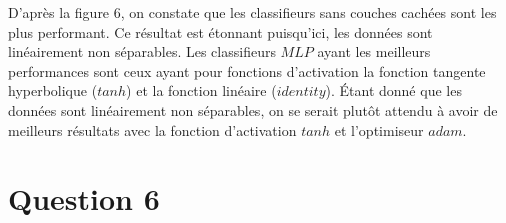 \documentclass[frenchb]{report}
\newcommand{\1}{\mathbbm{1}}
\theoremstyle{definition}\newtheorem{defn}{Définition}
\theoremstyle{definition}\newtheorem{exm}{Exemple}
\theoremstyle{definition}\newtheorem{nota}{Notation}
\theoremstyle{definition}\newtheorem{rem}{Remarque}
\begin{document}
\begin{figure}[htp] 
	\centering
	\hfill%
	\caption{}
\end{figure}

D'après la figure $6$, on constate que les classifieurs sans couches cachées sont les plus performant. Ce résultat est étonnant puisqu'ici, les données sont linéairement non séparables. Les classifieurs $MLP$ ayant les meilleurs performances sont ceux ayant pour fonctions d'activation la fonction tangente hyperbolique ($tanh$) et la fonction linéaire ($identity$). Étant donné que les données sont linéairement non séparables, on se serait plutôt attendu à avoir de meilleurs résultats avec la fonction d'activation $tanh$ et l'optimiseur $adam$.

\section*{Question 6}
\end{document}
